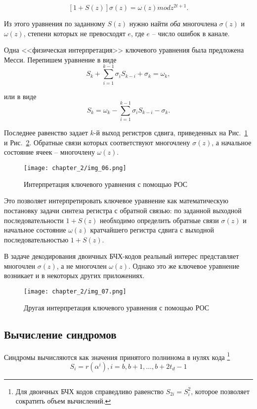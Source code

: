 $$[1+S(z)]\sigma(z)=\omega(z)mod z^{2t+1}.$$

Из этого уравнения по заданному $S(z)$ нужно найти \textit{оба} многочлена $\sigma(z)$
и $\omega(z)$, степени которых не превосходят $e$, где $e$ -- число ошибок в канале.

Одна <<физическая интерпретация>> ключевого уравнения была предложена Месси. Перепишем
уравнение в виде
$$S_k+\sum\limits_{i=1}^{k-1}\sigma_i S_{k-i}+\sigma_k=\omega_k,$$

или в виде
$$S_k=\omega_k-\sum\limits_{i=1}^{k-1}\sigma_iS_{k-i}-\sigma_k.$$

Последнее равенство задает $k$-й выход регистров сдвига, приведенных на Рис.~\ref{img_06} и Рис.~\ref{img_07}.
Обратные связи которых соответствуют многочлену $\sigma(z)$, а начальное состояние ячеек --
многочлену $\omega(z)$. 
\begin{figure}[htbp]
\begin{center}
\texttt{[image: chapter\_2/img\_06.png]}
\end{center}
\caption{Интерпретация ключевого уравнения с помощью РОС}
\label{img_06}
\end{figure}

Это позволяет интерпретировать ключевое уравнение как математическую постановку задачи синтеза регистра
с обратной связью: по заданной выходной последовательности $1+S(z)$ необходимо определить обратные
связи $\sigma(z)$ и начальное состояние $\omega(z)$ кратчайшего регистра сдвига с выходной последовательностью
$1+S(z)$.

В задаче декодирования двоичных БЧХ-кодов реальный интерес представляет многочлен $\sigma(z)$, а не
многочлен $\omega(z)$. Однако это же ключевое уравнение возникает и в некоторых других приложениях.

\begin{figure}[htbp]
\begin{center}
\texttt{[image: chapter\_2/img\_07.png]}
\end{center}
\caption{Другая интерпретация ключевого уравнения с помощью РОС}
\label{img_07}
\end{figure}

\subsection{Вычисление синдромов}
Синдромы вычисляются как значения принятого полнинома в нулях кода
\footnote{Для двоичных БЧХ кодов справедливо равенство $S_{2i}=S_i^2$, которое
позволяет сократить объем вычислений.}
$$S_i=r(\alpha^i), i=b, b+1, \ldots, b+2t_d -1$$

